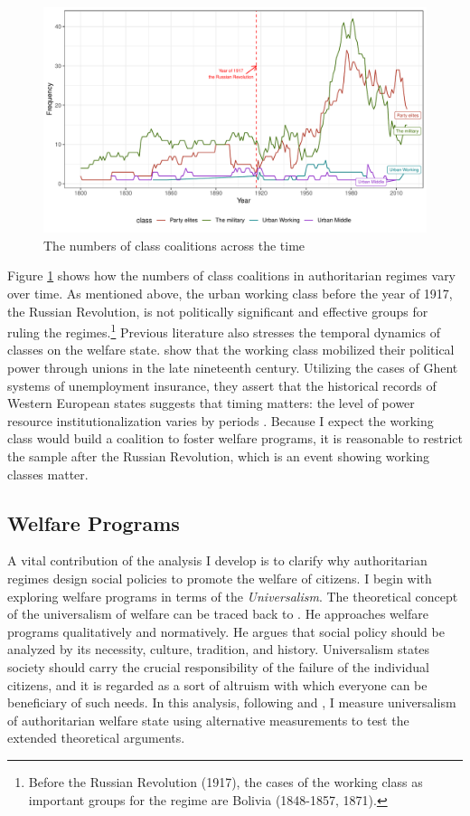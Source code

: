 \documentclass[12pt, letterpage, notitlepage]{article}
\begin{document}
\begin{figure}[!htbt]
	\centering
	\includegraphics[width=1\linewidth]{"2_Figures/Plot3"}
	\caption{The numbers of class coalitions across the time}
	\label{fig:plot2}
\end{figure}

Figure \ref{fig:plot2} shows how the numbers of class coalitions in authoritarian regimes vary over time. As mentioned above, the urban working class before the year of 1917, the Russian Revolution, is not politically significant and effective groups for ruling the regimes.\footnote{Before the Russian Revolution (1917), the cases of the working class as important groups for the regime are Bolivia (1848-1857, 1871).} Previous literature also stresses the temporal dynamics of classes on the welfare state. \citet{Rasmussen2018} show that the working class mobilized their political power through unions in the late nineteenth century. Utilizing the cases of Ghent systems of unemployment insurance, they assert that the historical records of Western European states suggests that timing matters: the level of power resource institutionalization varies by periods \citep[821-822]{Rasmussen2018}. Because I expect the working class would build a coalition to foster welfare programs, it is reasonable to restrict the sample after the Russian Revolution, which is an event showing working classes matter. 


\subsection{Welfare Programs}

A vital contribution of the analysis I develop is to clarify why authoritarian regimes design social policies to promote the welfare of citizens. I begin with exploring welfare programs in terms of the \textit{Universalism}. The theoretical concept of the universalism of welfare can be traced back to \citet{Titmuss1974}. He approaches welfare programs qualitatively and normatively. He argues that social policy should be analyzed by its necessity, culture, tradition, and history. Universalism states society should carry the crucial responsibility of the failure of the individual citizens, and it is regarded as a sort of altruism with which everyone can be beneficiary of such needs. In this analysis, following \citet{Knutsen2018} and \citet{Rasmussen2019}, I measure universalism of authoritarian welfare state using alternative measurements to test the extended theoretical arguments.
\end{document}
